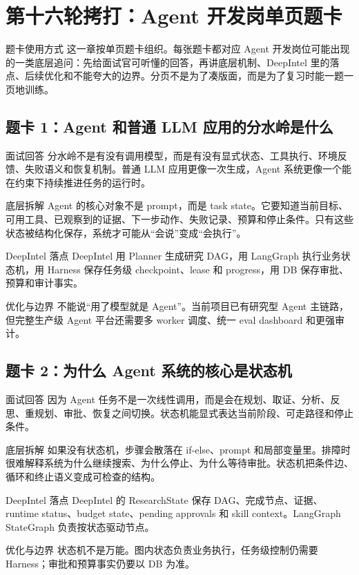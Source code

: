 \section{第十六轮拷打：Agent 开发岗单页题卡}

\begin{summaryBox}{题卡使用方式}
这一章按单页题卡组织。每张题卡都对应 Agent 开发岗位可能出现的一类底层追问：先给面试官可听懂的回答，再讲底层机制、DeepIntel 里的落点、后续优化和不能夸大的边界。分页不是为了凑版面，而是为了复习时能一题一页地训练。
\end{summaryBox}

\newcommand{\agentcard}[5]{
\clearpage
\subsection{#1}
\begin{qaBox}{面试回答}
#2
\end{qaBox}
\begin{analysisBox}{底层拆解}
#3
\end{analysisBox}
\begin{summaryBox}{DeepIntel 落点}
#4
\end{summaryBox}
\begin{riskBox}{优化与边界}
#5
\end{riskBox}
}

\agentcard{题卡 1：Agent 和普通 LLM 应用的分水岭是什么}
{分水岭不是有没有调用模型，而是有没有显式状态、工具执行、环境反馈、失败语义和恢复机制。普通 LLM 应用更像一次生成，Agent 系统更像一个能在约束下持续推进任务的运行时。}
{Agent 的核心对象不是 prompt，而是 task state。它要知道当前目标、可用工具、已观察到的证据、下一步动作、失败记录、预算和停止条件。只有这些状态被结构化保存，系统才可能从“会说”变成“会执行”。}
{DeepIntel 用 Planner 生成研究 DAG，用 LangGraph 执行业务状态机，用 Harness 保存任务级 checkpoint、lease 和 progress，用 DB 保存审批、预算和审计事实。}
{不能说“用了模型就是 Agent”。当前项目已有研究型 Agent 主链路，但完整生产级 Agent 平台还需要多 worker 调度、统一 eval dashboard 和更强审计。}

\agentcard{题卡 2：为什么 Agent 系统的核心是状态机}
{因为 Agent 任务不是一次线性调用，而是会在规划、取证、分析、反思、重规划、审批、恢复之间切换。状态机能显式表达当前阶段、可走路径和停止条件。}
{如果没有状态机，步骤会散落在 if-else、prompt 和局部变量里。排障时很难解释系统为什么继续搜索、为什么停止、为什么等待审批。状态机把条件边、循环和终止语义变成可检查的结构。}
{DeepIntel 的 ResearchState 保存 DAG、完成节点、证据、runtime status、budget state、pending approvals 和 skill context。LangGraph StateGraph 负责按状态驱动节点。}
{状态机不是万能。图内状态负责业务执行，任务级控制仍需要 Harness；审批和预算事实仍要以 DB 为准。}


